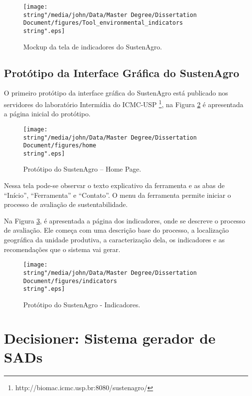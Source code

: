 \begin{figure}
\centering{}\texttt{[image: \\string"/media/john/Data/Master Degree/Dissertation Document/figures/Tool\_environmental\_indicators\\string".eps]}\caption{Mockup da tela de indicadores do SustenAgro.\label{fig:Mockup_indicators}}
\end{figure}


\section{Protótipo da Interface Gráfica do SustenAgro}

O primeiro protótipo da interface gráfica do SustenAgro está publicado
nos servidores do laboratório Intermídia do ICMC\nobreakdash-USP
\footnote{http://biomac.icmc.usp.br:8080/sustenagro/}, na Figura
\ref{fig:Home} é apresentada a página inicial do protótipo.

\begin{figure}
\begin{centering}
\texttt{[image: \\string"/media/john/Data/Master Degree/Dissertation Document/figures/home\\string".eps]}
\par\end{centering}
\caption{Protótipo do SustenAgro – Home Page.\label{fig:Home}}
\end{figure}

Nessa tela pode-se observar o texto explicativo da ferramenta e as
abas de ``Início'', ``Ferramenta'' e ``Contato''. O menu da
ferramenta permite iniciar o processo de avaliação de sustentabilidade.

Na Figura \ref{fig:Indicators}, é apresentada a página dos indicadores,
onde se descreve o processo de avaliação. Ele começa com uma descrição
base do processo, a localização geográfica da unidade produtiva, a
caracterização dela, os indicadores e as recomendações que o sistema
vai gerar.

\begin{figure}
\centering{}\texttt{[image: \\string"/media/john/Data/Master Degree/Dissertation Document/figures/indicators\\string".eps]}\caption{Protótipo do SustenAgro - Indicadores.\label{fig:Indicators}}
\end{figure}


\chapter{Decisioner: Sistema gerador de SADs}

